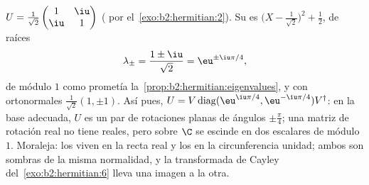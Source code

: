 \begin{example}\label{ex:b2:hermitian:unitary}
$U = \frac{1}{\sqrt2}\begin{pmatrix} 1 & \iu\\ \iu & 1
\end{pmatrix}$ ( por el~\cref{exo:b2:hermitian:2}). Su
 es $\bigl(X - \frac{1}{\sqrt2}\bigr)^2 +
\frac12$, de raíces
\[
\lambda_\pm = \frac{1 \pm \iu}{\sqrt2} = \eu^{\pm\iu\pi/4},
\]
de módulo $1$ como prometía la~\cref{prop:b2:hermitian:eigenvalues}, y
con  ortonormales $\frac{1}{\sqrt2}(1, \pm1)$. Así
pues, $U = V\operatorname{diag}(\eu^{\iu\pi/4},
\eu^{-\iu\pi/4})V^\dagger$: en la base adecuada, $U$ es un par de
rotaciones planas de ángulos $\pm\frac\pi4$; una matriz de rotación
real no tiene  reales, pero sobre $\C$ se escinde en
dos escalares de módulo $1$. Moraleja: los   viven
en la recta real y los  en la circunferencia unidad; ambos
son sombras de la misma normalidad, y la transformada de Cayley del~\cref{exo:b2:hermitian:6} lleva una imagen a la otra.
\end{example}

